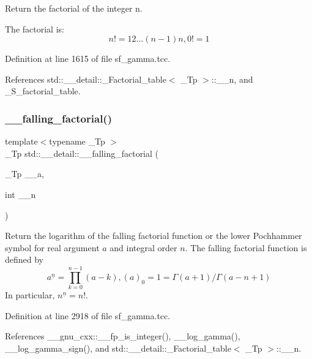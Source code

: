 Return the factorial of the integer n. 

The factorial is\+: \[ n! = 1 2 ... (n-1) n, 0! = 1 \] 

Definition at line 1615 of file sf\+\_\+gamma.\+tcc.



References std\+::\+\_\+\+\_\+detail\+::\+\_\+\+Factorial\+\_\+table$<$ \+\_\+\+Tp $>$\+::\+\_\+\+\_\+n, and \+\_\+\+S\+\_\+factorial\+\_\+table.

\mbox{\label{namespacestd_1_1____detail_a62ddf0f8d9467f4c3f2cc0b500ca1272}} 
\subsubsection{\texorpdfstring{\+\_\+\+\_\+falling\+\_\+factorial()}{\_\_falling\_factorial()}\hspace{0.1cm}{\footnotesize\ttfamily [1/2]}}
{\footnotesize\ttfamily template$<$typename \+\_\+\+Tp $>$ \\
\+\_\+\+Tp std\+::\+\_\+\+\_\+detail\+::\+\_\+\+\_\+falling\+\_\+factorial (\begin{DoxyParamCaption}\item[{\+\_\+\+Tp}]{\+\_\+\+\_\+a,  }\item[{int}]{\+\_\+\+\_\+n }\end{DoxyParamCaption})}



Return the logarithm of the falling factorial function or the lower Pochhammer symbol for real argument $ a $ and integral order $ n $. The falling factorial function is defined by \[ a^{\underline{n}} = \prod_{k=0}^{n-1} (a - k), (a)_0 = 1 = \Gamma(a + 1) / \Gamma(a - n + 1) \] In particular, $ n^{\underline{n}} = n! $. 



Definition at line 2918 of file sf\+\_\+gamma.\+tcc.



References \+\_\+\+\_\+gnu\+\_\+cxx\+::\+\_\+\+\_\+fp\+\_\+is\+\_\+integer(), \+\_\+\+\_\+log\+\_\+gamma(), \+\_\+\+\_\+log\+\_\+gamma\+\_\+sign(), and std\+::\+\_\+\+\_\+detail\+::\+\_\+\+Factorial\+\_\+table$<$ \+\_\+\+Tp $>$\+::\+\_\+\+\_\+n.



